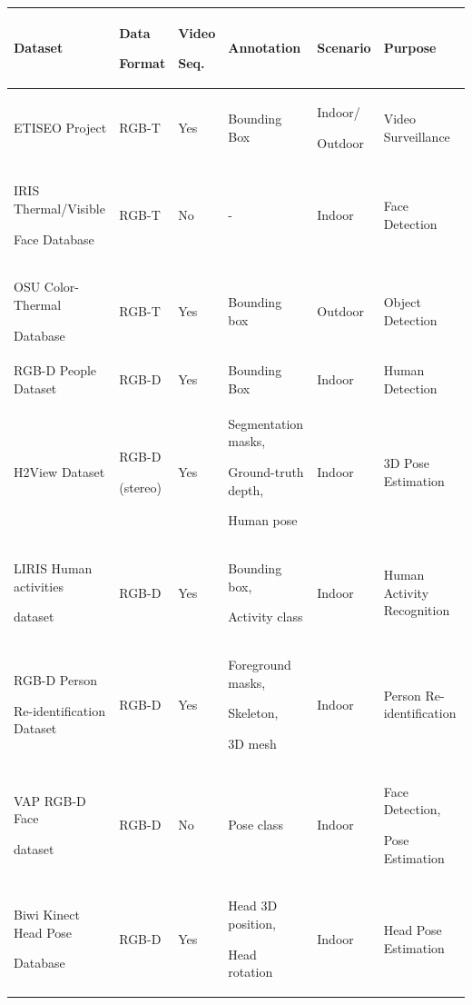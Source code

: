 \documentclass[10pt,twocolumn,letterpaper]{article}
\begin{document}
\begin{table}[htpb]
\centering
\begin{tabular}{p{4cm}p{1.5cm}p{0.7cm}p{3cm}p{1.2cm}p{4.1cm}}
\hline
Dataset & Data \par Format\strut & Video \par Seq.\strut & Annotation & Scenario & Purpose \\ \hline
ETISEO Project \cite{nghiem2007etiseo} & RGB-T & Yes & Bounding Box & Indoor/ \par Outdoor\strut & Video Surveillance \\
IRIS Thermal/Visible \par Face Database \cite{iris2007dataset}\strut	&	RGB-T	&	No	&	-	&	Indoor	&	Face Detection \\
OSU Color-Thermal \par Database \cite{davis2007background}\strut	&	RGB-T	&	Yes	&	Bounding box	&	Outdoor	&	Object Detection \\
RGB-D People Dataset \cite{spinello2011people}	&	RGB-D	&	Yes	&	Bounding Box	&	Indoor	&	Human Detection \\
H2View Dataset \cite{sheasby2012simultaneous}	&	RGB-D  \par(stereo)\strut 	&	Yes	&	Segmentation masks, \par Ground-truth depth,\strut \par Human pose\strut	&	Indoor	&	3D Pose Estimation \\
LIRIS Human activities \par dataset \cite{wolf2012liris}\strut	&	RGB-D	&	Yes	& Bounding box, \par Activity class\strut	&	Indoor	&	Human Activity Recognition \\
RGB-D Person \par Re-identification Dataset \cite{barbosa2012re}\strut	&	RGB-D	&	Yes	&	Foreground masks, \par Skeleton,\strut \par3D mesh\strut 	&	Indoor	&	Person Re-identification \\
VAP RGB-D Face \par dataset \cite{hg2012rgb}\strut	&	RGB-D	&	No	&	Pose class	&	Indoor	&	Face Detection, \par Pose Estimation\strut \\
Biwi Kinect Head Pose \par Database \cite{fanelli2013random}\strut	&	RGB-D	&	Yes	&	Head 3D position, \par Head rotation\strut	&	Indoor	&	Head Pose Estimation \\

\end{tabular}
\end{table}
\end{document}
